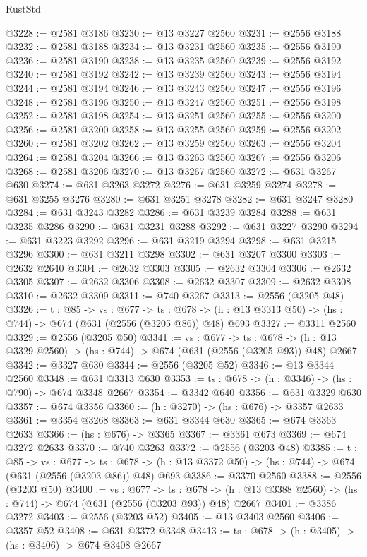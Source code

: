 \begin{lexlean}{RustStd}
\begin{coremodule}
@3228 := @2581 @3186
@3230 := @13 @3227 @2560
@3231 := @2556 @3188
@3232 := @2581 @3188
@3234 := @13 @3231 @2560
@3235 := @2556 @3190
@3236 := @2581 @3190
@3238 := @13 @3235 @2560
@3239 := @2556 @3192
@3240 := @2581 @3192
@3242 := @13 @3239 @2560
@3243 := @2556 @3194
@3244 := @2581 @3194
@3246 := @13 @3243 @2560
@3247 := @2556 @3196
@3248 := @2581 @3196
@3250 := @13 @3247 @2560
@3251 := @2556 @3198
@3252 := @2581 @3198
@3254 := @13 @3251 @2560
@3255 := @2556 @3200
@3256 := @2581 @3200
@3258 := @13 @3255 @2560
@3259 := @2556 @3202
@3260 := @2581 @3202
@3262 := @13 @3259 @2560
@3263 := @2556 @3204
@3264 := @2581 @3204
@3266 := @13 @3263 @2560
@3267 := @2556 @3206
@3268 := @2581 @3206
@3270 := @13 @3267 @2560
@3272 := @631 @3267 @630
@3274 := @631 @3263 @3272
@3276 := @631 @3259 @3274
@3278 := @631 @3255 @3276
@3280 := @631 @3251 @3278
@3282 := @631 @3247 @3280
@3284 := @631 @3243 @3282
@3286 := @631 @3239 @3284
@3288 := @631 @3235 @3286
@3290 := @631 @3231 @3288
@3292 := @631 @3227 @3290
@3294 := @631 @3223 @3292
@3296 := @631 @3219 @3294
@3298 := @631 @3215 @3296
@3300 := @631 @3211 @3298
@3302 := @631 @3207 @3300
@3303 := @2632 @2640
@3304 := @2632 @3303
@3305 := @2632 @3304
@3306 := @2632 @3305
@3307 := @2632 @3306
@3308 := @2632 @3307
@3309 := @2632 @3308
@3310 := @2632 @3309
@3311 := @740 @3267
@3313 := @2556 (@3205 @48)
@3326 := {t : @85} ->
  {vs : @677} ->
  {ts : @678} -> (h : @13 @3313 @50) -> (hs : @744) -> @674 (@631 (@2556 (@3205 @86)) @48) @693
@3327 := @3311 @2560
@3329 := @2556 (@3205 @50)
@3341 := {vs : @677} ->
  {ts : @678} -> (h : @13 @3329 @2560) -> (hs : @744) -> @674 (@631 (@2556 (@3205 @93)) @48) @2667
@3342 := @3327 @630
@3344 := @2556 (@3205 @52)
@3346 := @13 @3344 @2560
@3348 := @631 @3313 @630
@3353 := {ts : @678} -> (h : @3346) -> (hs : @790) -> @674 @3348 @2667
@3354 := @3342 @640
@3356 := @631 @3329 @630
@3357 := @674 @3356
@3360 := (h : @3270) -> (hs : @676) -> @3357 @2633
@3361 := @3354 @3268
@3363 := @631 @3344 @630
@3365 := @674 @3363 @2633
@3366 := (hs : @676) -> @3365
@3367 := @3361 @673
@3369 := @674 @3272 @2633
@3370 := @740 @3263
@3372 := @2556 (@3203 @48)
@3385 := {t : @85} ->
  {vs : @677} ->
  {ts : @678} -> (h : @13 @3372 @50) -> (hs : @744) -> @674 (@631 (@2556 (@3203 @86)) @48) @693
@3386 := @3370 @2560
@3388 := @2556 (@3203 @50)
@3400 := {vs : @677} ->
  {ts : @678} -> (h : @13 @3388 @2560) -> (hs : @744) -> @674 (@631 (@2556 (@3203 @93)) @48) @2667
@3401 := @3386 @3272
@3403 := @2556 (@3203 @52)
@3405 := @13 @3403 @2560
@3406 := @3357 @52
@3408 := @631 @3372 @3348
@3413 := {ts : @678} -> (h : @3405) -> (hs : @3406) -> @674 @3408 @2667

\end{coremodule}
\end{lexlean}
